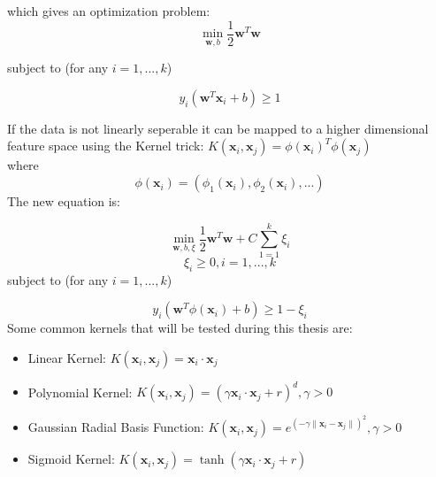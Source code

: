 \documentclass{article}
\begin{document}
which gives an optimization problem: \\

\begin{equation}
\min_{\textbf{w},b} \dfrac{1}{2}\textbf{w}^{T}\textbf{w}
\end{equation}

subject to (for any $ i = 1,...,k $)

\begin{equation*}
y_{i}(\textbf{w}^{T}\textbf{x}_{i} + b) \geq 1
\end{equation*}

If the data is not linearly seperable it can be mapped to a higher dimensional feature space using the Kernel trick: $ K(\textbf{x}_{i},\textbf{x}_{j}) = \phi(\textbf{x}_{i})^{T}\phi(\textbf{x}_{j}) $ \\
where
\begin{equation*}
\phi(\textbf{x}_{i}) = (\phi_{1}(\textbf{x}_{i}), \phi_{2}(\textbf{x}_{i}),...)
\end{equation*}
The new equation is:

\begin{equation}
\min_{\textbf{w},b, \xi} \dfrac{1}{2}\textbf{w}^{T}\textbf{w} + C\sum_{1 = 1}^{k}\xi_{i}
\end{equation}
\begin{equation*}
\xi_{i} \geq 0, i = 1,...,k
\end{equation*}
subject to (for any $ i = 1,...,k $)

\begin{equation*}
y_{i}(\textbf{w}^{T}\phi(\textbf{x}_{i}) + b) \geq 1 - \xi_{i}
\end{equation*}
Some common kernels that will be tested during this thesis are: \\
\begin{itemize}
\item Linear Kernel: $K(\textbf{x}_i,\textbf{x}_{j}) = \textbf{x}_i\cdot\textbf{x}_{j}$

\item Polynomial Kernel: $K(\textbf{x}_i,\textbf{x}_{j}) = (\gamma\textbf{x}_i\cdot\textbf{x}_{j} + r)^d, \gamma > 0$

\item Gaussian Radial Basis Function: $K(\textbf{x}_i,\textbf{x}_{j}) = e^{(-\gamma\|\textbf{x}_i-\textbf{x}_{j}\|)^2}, \gamma > 0$

\item Sigmoid Kernel: $K(\textbf{x}_i,\textbf{x}_{j}) = \tanh(\gamma\textbf{x}_i\cdot\textbf{x}_{j} + r)$
\end{itemize}
\end{document}
